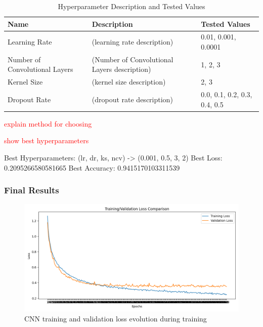 \begin{table}[h!]
\caption{Hyperparameter Description and Tested Values}
\label{table:cnn_hyperparameters}
\centering
\begin{tabular}{ |p{\myc}|p{\mycc}|p{\myccc}| } 
\hline
Name & Description & Tested Values \\
\hline
\multirow{2}{\myc}{Learning Rate} & \multirow{2}{\mycc}{(learning rate description)} &\multirow{2}{\myccc}{0.01, 0.001, 0.0001} \\
& & \\
\hline
\multirow{3}{\myc}{Number of Convolutional Layers} & \multirow{3}{\mycc}{(Number of Convolutional Layers description)} & \multirow{3}{\myccc}{1, 2, 3} \\ 
& & \\
& & \\
\hline
\multirow{2}{\myc}{Kernel Size} & \multirow{2}{\mycc}{(kernel size description)} & \multirow{2}{\myccc}{2, 3} \\ 
& & \\
\hline
\multirow{2}{\myc}{Dropout Rate} & \multirow{2}{\mycc}{(dropout rate description)} & \multirow{2}{\myccc}{0.0, 0.1, 0.2, 0.3, 0.4, 0.5} \\ 
& & \\
\hline
\end{tabular}
\end{table}

\textcolor{red}{explain method for choosing}

\textcolor{red}{show best hyperparameters}

Best Hyperparameters: (lr, dr, ks, ncv) -> (0.001, 0.5, 3, 2)
Best Loss: 0.2095266580581665
Best Accuracy: 0.9415170103311539

\subsubsection{Final Results}

\begin{figure}[h]
\centerline{\includegraphics[width=14cm]{figs/loss_comparison.png}}
\caption[CNN training and validation loss evolution during training]{CNN training and validation loss evolution during training}
\label{fig:cnn_loss}
\end{figure}

